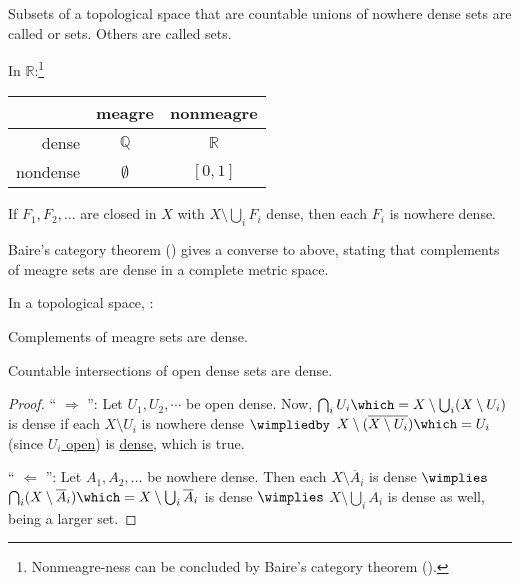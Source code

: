	Subsets of a topological space that are countable unions of nowhere dense sets are called  or  sets. Others are called  sets.
	
	\begin{rmk}
		In $\mathbb R$:\footnote{Nonmeagre-ness can be concluded by Baire's category theorem ().}
		\begin{center}
			\begin{tabular}{r|cc}
				& meagre & nonmeagre\\
				\hline
				dense & $\mathbb Q$ & $\mathbb R$\\
				nondense & $\emptyset$ & $[0, 1]$
			\end{tabular}
		\end{center}
	\end{rmk}
	
	\begin{lem}
		If $F_1, F_2, \ldots$ are closed in $X$ with $X\setminus\bigcup_i F_i$ dense, then each $F_i$ is nowhere dense.
	\end{lem}
	
	\begin{rmk}
		Baire's category theorem () gives a converse to above, stating that complements of meagre sets are dense in a complete metric space.
	\end{rmk}
	
	\begin{prp}\label{PRP: versions of BCT}
		In a topological space, \tfae:
		\begin{mylist}
			\item\label{PRPi: versions of BCT} Complements of meagre sets are dense.
			\item\label{PRPii: versions of BCT} Countable intersections of open dense sets are dense.
		\end{mylist}
	\end{prp}
	
	\begin{proof}
		`` $\Rightarrow$ '': Let $U_1, U_2, \cdots$ be open dense. Now, $\bigcap_i U_i \which= X\setminus\bigcup_i(X\setminus U_i)$ is dense if each $X\setminus U_i$ is nowhere dense $\wimpliedby$ $X\setminus(\overline{X\setminus U_i})\which= U_i$ (since \ul{$U_i$ open}) is \ul{dense}, which is true.
		
		`` $\Leftarrow$ '': Let $A_1, A_2, \ldots$ be nowhere dense. Then each $X\setminus\overline A_i$ is dense $\wimplies$ $\bigcap_i(X\setminus \overline A_i)\which= X\setminus\bigcup_i\overline A_i$ is dense $\wimplies$ $X\setminus\bigcup_i A_i$ is dense as well, being a larger set.
	\end{proof}
	
